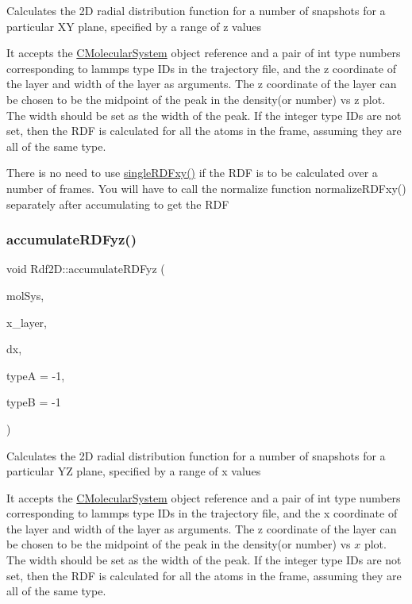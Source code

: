 Calculates the 2D radial distribution function for a number of snapshots for a particular XY plane, specified by a range of z values

It accepts the \mbox{\hyperlink{classCMolecularSystem}{C\+Molecular\+System}} object reference and a pair of int type numbers corresponding to lammps type I\+Ds in the trajectory file, and the z coordinate of the layer and width of the layer as arguments. The z coordinate of the layer can be chosen to be the midpoint of the peak in the density(or number) vs z plot. The width should be set as the width of the peak. If the integer type I\+Ds are not set, then the R\+DF is calculated for all the atoms in the frame, assuming they are all of the same type.

There is no need to use \mbox{\hyperlink{classRdf2D_afc5ff73aa9c126184e94ee3abfc14ff4}{single\+R\+D\+Fxy()}} if the R\+DF is to be calculated over a number of frames. You will have to call the normalize function normalize\+R\+D\+Fxy() separately after accumulating to get the R\+DF \mbox{\label{classRdf2D_a26d388ff4f8b626c22fa3ea12332e1d7}} 
\subsubsection{\texorpdfstring{accumulate\+R\+D\+Fyz()}{accumulateRDFyz()}}
{\footnotesize\ttfamily void Rdf2\+D\+::accumulate\+R\+D\+Fyz (\begin{DoxyParamCaption}\item[{class \mbox{\hyperlink{classCMolecularSystem}{C\+Molecular\+System}} \&}]{mol\+Sys,  }\item[{double}]{x\+\_\+layer,  }\item[{double}]{dx,  }\item[{int}]{typeA = {\ttfamily -\/1},  }\item[{int}]{typeB = {\ttfamily -\/1} }\end{DoxyParamCaption})}

Calculates the 2D radial distribution function for a number of snapshots for a particular YZ plane, specified by a range of x values

It accepts the \mbox{\hyperlink{classCMolecularSystem}{C\+Molecular\+System}} object reference and a pair of int type numbers corresponding to lammps type I\+Ds in the trajectory file, and the x coordinate of the layer and width of the layer as arguments. The z coordinate of the layer can be chosen to be the midpoint of the peak in the density(or number) vs $x$ plot. The width should be set as the width of the peak. If the integer type I\+Ds are not set, then the R\+DF is calculated for all the atoms in the frame, assuming they are all of the same type.

